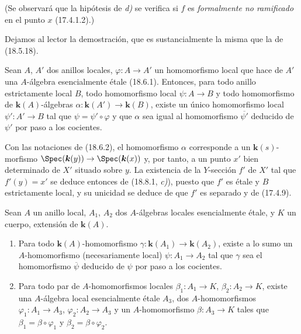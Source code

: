 
(Se observará que la hipótesis de \emph{d)} se verifica si $f$ es \emph{formalmente no ramificado} en el punto $x$ (17.4.1.2).)

Dejamos al lector la demostración, que es sustancialmente la misma que la de (18.5.18).

\begin{lemma}[18.8.4]
\label{IV.18.8.4}
Sean $A$, $A'$ dos anillos locales, $\varphi:A\to A'$ un homomorfismo local que hace de $A'$ una $A$-álgebra esencialmente étale \textup{(18.6.1)}. Entonces, para todo anillo estrictamente local $B$, todo homomorfismo local $\psi:A\to B$ y todo homomorfismo de $\boldsymbol{k}(A)$-álgebras $\alpha:\boldsymbol{k}(A')\to\boldsymbol{k}(B)$, existe un único homomorfismo local $\psi':A'\to B$ tal que $\psi=\psi'\circ\varphi$ y que $\alpha$ sea igual al homomorfismo $\overline{\psi'}$ deducido de $\psi'$ por paso a los cocientes.
\end{lemma}

Con las notaciones de (18.6.2), el homomorfismo $\alpha$ corresponde a un $\boldsymbol{k}(s)$-morfismo $\Spec(\boldsymbol{k}(y))\to\Spec(\boldsymbol{k}(x))$ y, por tanto, a un punto $x'$ bien determinado de $X'$ situado sobre $y$. La existencia de la $Y$-sección $f'$ de $X'$ tal que $f'(y)=x'$ se deduce entonces de (18.8.1, \emph{c)}), puesto que $f'$ es étale y $B$ estrictamente local, y su unicidad se deduce de que $f'$ es separado y de (17.4.9).

\begin{lemma}[18.8.5]
\label{IV.18.8.5}
Sean $A$ un anillo local, $A_1$, $A_2$ dos $A$-álgebras locales esencialmente étale, y $K$ un cuerpo, extensión de $\boldsymbol{k}(A)$.
\begin{enumerate}
  \item[\textup{(i)}] Para todo $\boldsymbol{k}(A)$-homomorfismo $\gamma:\boldsymbol{k}(A_1)\to\boldsymbol{k}(A_2)$, existe a lo sumo un $A$-homomorfismo (necesariamente local) $\psi:A_1\to A_2$ tal que $\gamma$ sea el homomorfismo $\overline\psi$ deducido de $\psi$ por paso a los cocientes.
  \item[\textup{(ii)}] Para todo par de $A$-homomorfismos locales $\beta_1:A_1\to K$, $\beta_2:A_2\to K$, existe una $A$-álgebra local esencialmente étale $A_3$, dos $A$-homomorfismos $\varphi_1:A_1\to A_3$, $\varphi_2:A_2\to A_3$ y un $A$-homomorfismo $\beta:A_3\to K$ tales que $\beta_1=\beta\circ\varphi_1$ y $\beta_2=\beta\circ\varphi_2$.
\end{enumerate}
\end{lemma}

